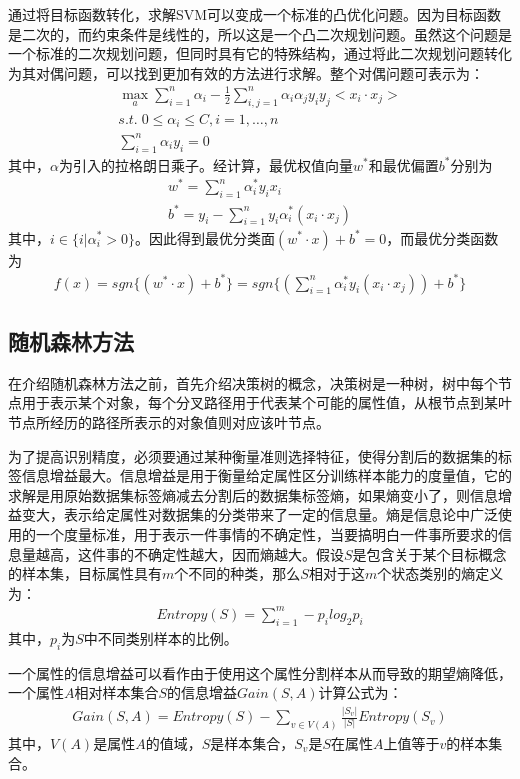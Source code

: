通过将目标函数转化，求解SVM可以变成一个标准的凸优化问题。因为目标函数是二次的，而约束条件是线性的，所以这是一个凸二次规划问题。虽然这个问题是一个标准的二次规划问题，但同时具有它的特殊结构，通过将此二次规划问题转化为其对偶问题，可以找到更加有效的方法进行求解。整个对偶问题可表示为：
\begin{align}
\max_a\sum_{i = 1}^n\alpha_i - \frac{1}{2}\sum_{i, j = 1}^n\alpha_i\alpha_j y_i y_j < x_i \cdot x_j >\\
s.t. \; 0 \le \alpha_i \le C, i = 1, \ldots, n \\
\sum_{i =1}^n\alpha_i y_i = 0
\end{align}
其中，$\alpha$为引入的拉格朗日乘子。经计算，最优权值向量$w^*$和最优偏置$b^*$分别为
\begin{align}
w^* = \sum_{i= 1}^n \alpha_i^*y_i x_i \\
b^* = y_i - \sum_{i = 1}^n y_i \alpha_i^*(x_i \cdot x_j)
\end{align}
其中，$i\in \{ i|\alpha_i^* > 0\}$。因此得到最优分类面$(w^* \cdot x) + b^* = 0$，而最优分类函数为
\begin{align}
f(x) = sgn\{(w^* \cdot x) + b^*\} = sgn\{(\sum_{i = 1}^n\alpha_i^*y_i(x_i \cdot x_j)) + b^*\}
\end{align}

\subsection{随机森林方法}

在介绍随机森林方法之前，首先介绍决策树的概念，决策树是一种树，树中每个节点用于表示某个对象，每个分叉路径用于代表某个可能的属性值，从根节点到某叶节点所经历的路径所表示的对象值则对应该叶节点。

为了提高识别精度，必须要通过某种衡量准则选择特征，使得分割后的数据集的标签信息增益最大。信息增益是用于衡量给定属性区分训练样本能力的度量值，它的求解是用原始数据集标签熵减去分割后的数据集标签熵，如果熵变小了，则信息增益变大，表示给定属性对数据集的分类带来了一定的信息量。熵是信息论中广泛使用的一个度量标准，用于表示一件事情的不确定性，当要搞明白一件事所要求的信息量越高，这件事的不确定性越大，因而熵越大。假设$S$是包含关于某个目标概念的样本集，目标属性具有$m$个不同的种类，那么$S$相对于这$m$个状态类别的熵定义为：
\begin{align}
Entropy(S) = \sum_{i = 1}^m -p_i log_2 p_i
\end{align}
其中，$p_i$为$S$中不同类别样本的比例。

一个属性的信息增益可以看作由于使用这个属性分割样本从而导致的期望熵降低，一个属性$A$相对样本集合$S$的信息增益$Gain(S, A)$计算公式为：
\begin{align}
Gain(S, A) = Entropy(S) - \sum_{v\in V(A)} \frac{|S_v|}{|S|} Entropy(S_v)
\end{align}
其中，$V(A)$是属性$A$的值域，$S$是样本集合，$S_v$是$S$在属性$A$上值等于$v$的样本集合。

